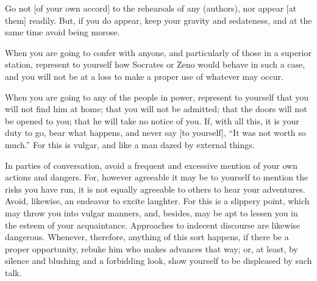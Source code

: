 Go not [of your own accord] to the rehearsals of any 
(authors), nor appear [at them] readily. But, if you do appear, keep your
gravity and sedateness, and at the same time avoid being morose.

When you are going to confer with anyone, and particularly of those
in a superior station, represent to yourself how Socrates or Zeno
would behave in such a case, and you will not be at a loss to make
a proper use of whatever may occur. 

When you are going to any of the people in power, represent to yourself
that you will not find him at home; that you will not be admitted;
that the doors will not be opened to you; that he will take no notice
of you. If, with all this, it is your duty to go, bear what happens,
and never say [to yourself], ``It was not worth so much.'' For this
is vulgar, and like a man dazed by external things. 

In parties of conversation, avoid a frequent and excessive mention
of your own actions and dangers. For, however agreeable it may be
to yourself to mention the risks you have run, it is not equally agreeable
to others to hear your adventures. Avoid, likewise, an endeavor to
excite laughter. For this is a slippery point, which may throw you
into vulgar manners, and, besides, may be apt to lessen you in the
esteem of your acquaintance. Approaches to indecent discourse are
likewise dangerous. Whenever, therefore, anything of this sort happens,
if there be a proper opportunity, rebuke him who makes advances that
way; or, at least, by silence and blushing and a forbidding look,
show yourself to be displeased by such talk. 
